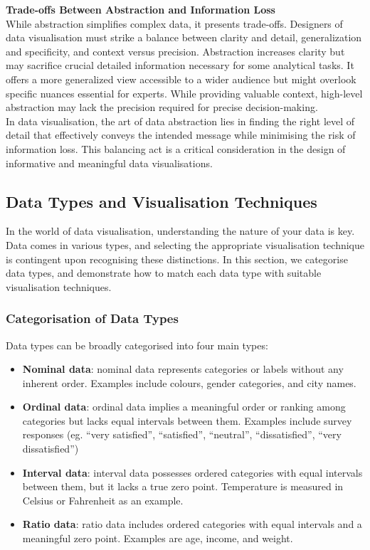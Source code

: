 \documentclass{article}\usepackage[]{graphicx}\usepackage[]{xcolor}
\begin{document}
\noindent \textbf{Trade-offs Between Abstraction and Information Loss}\\
While abstraction simplifies complex data, it presents trade-offs. Designers of data visualisation must strike a balance between clarity and detail, generalization and specificity, and context versus precision. Abstraction increases clarity but may sacrifice crucial detailed information necessary for some analytical tasks. It offers a more generalized view accessible to a wider audience but might overlook specific nuances essential for experts. While providing valuable context, high-level abstraction may lack the precision required for precise decision-making.\\ 

In data visualisation, the art of data abstraction lies in finding the right level of detail that effectively conveys the intended message while minimising the risk of information loss. This balancing act is a critical consideration in the design of informative and meaningful data visualisations.


\subsection{Data Types and Visualisation Techniques}
In the world of data visualisation, understanding the nature of your data is key. Data comes in various types, and selecting the appropriate visualisation technique is contingent upon recognising these distinctions. In this section, we categorise data types, and demonstrate how to match each data type with suitable visualisation techniques.

\subsubsection{Categorisation of Data Types}
Data types can be broadly categorised into four main types: 
\begin{itemize}
    \item \textbf{Nominal data}: nominal data represents categories or labels without any inherent order. Examples include colours, gender categories, and city names. 
    \item \textbf{Ordinal data}: ordinal data implies a meaningful order or ranking among categories but lacks equal intervals between them. Examples include survey responses (eg. “very satisfied”, “satisfied”, “neutral”, “dissatisfied”, “very dissatisfied”)
    \item \textbf{Interval data}: interval data possesses ordered categories with equal intervals between them, but it lacks a true zero point. Temperature is measured in Celsius or Fahrenheit as an example. 
    \item \textbf{Ratio data}: ratio data includes ordered categories with equal intervals and a meaningful zero point. Examples are age, income, and weight. 
\end{itemize}
\end{document}
